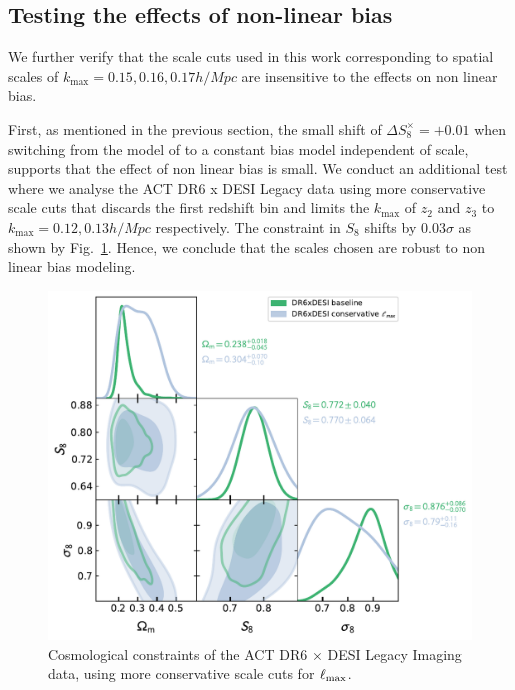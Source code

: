 \documentclass[twocolumn]{aastex631}
\begin{document}
{\subsection{Testing the effects of non-linear bias} \label{app.nonlinear}
We further verify that the scale cuts used in this work corresponding to spatial scales of $k_\mathrm{max}=0.15,0.16,0.17h/\si{Mpc}$ are insensitive to the effects on non linear bias.

First, as mentioned in the previous section, the small shift of $\Delta{S^{\times}_8}=+0.01$ when switching from the model of \citep{hang2021} to a constant bias model independent of scale, supports that the effect of non linear bias is small. We conduct an additional test where we analyse the ACT DR6 x DESI Legacy data using more conservative scale cuts that discards the first redshift bin and limits the $k_\mathrm{max}$ of $z_2$ and $z_3$ to $k_\mathrm{max}=0.12,0.13h/\si{Mpc}$ respectively. The constraint in $S_8$ shifts by $0.03\sigma$ as shown by Fig.~\ref{fig:planckXcorner-cut}. Hence, we conclude that the scales chosen are robust to non linear bias modeling.

\begin{figure}
    \centering
\includegraphics{figures/base.pdf}
    \caption{Cosmological constraints of the ACT DR6 $\times$ DESI Legacy Imaging data, using more conservative scale cuts for $\ell_{\rm max}$.}
    \label{fig:planckXcorner-cut}
\end{figure}



}
\end{document}
